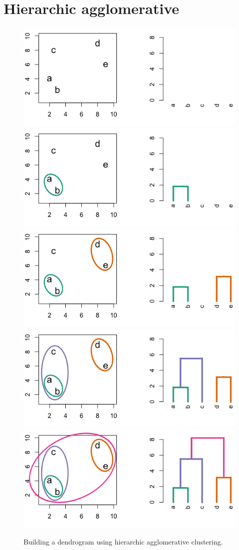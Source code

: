 \documentclass[]{book}
\theoremstyle{definition}
\theoremstyle{definition}
\theoremstyle{definition}
\theoremstyle{remark}
\begin{document}
\section{Hierarchic agglomerative}\label{hierarchic-agglomerative}

\begin{figure}

{\centering \includegraphics[width=0.55\linewidth]{images/hclust_demo_0} \includegraphics[width=0.55\linewidth]{images/hclust_demo_1} \includegraphics[width=0.55\linewidth]{images/hclust_demo_2} \includegraphics[width=0.55\linewidth]{images/hclust_demo_3} \includegraphics[width=0.55\linewidth]{images/hclust_demo_4} 

}

\caption{Building a dendrogram using hierarchic agglomerative clustering.}\label{fig:hierarchicClusteringDemo}
\end{figure}
\end{document}
